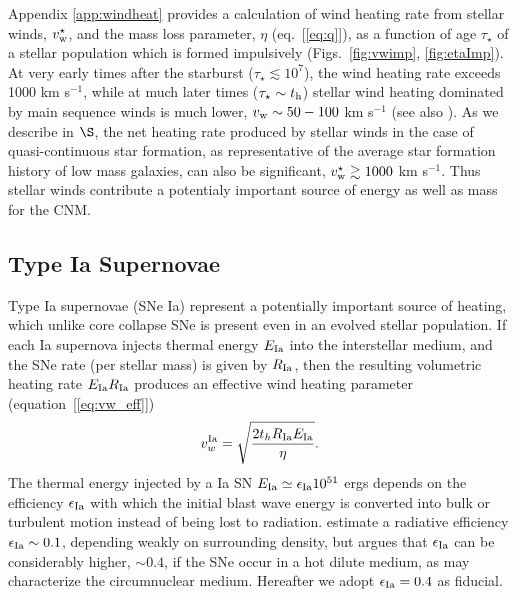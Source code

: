 \documentclass[usenatbib,fleqn]{mn2e}
\begin{document}
Appendix \ref{app:windheat} provides a calculation of wind heating rate from stellar winds, $v_{\rm w}^{\star}$, and the mass loss parameter, $\eta$ (eq.~[\ref{eq:q}]), as a function of age $\tau_{\star}$ of a stellar population which is formed impulsively (Figs.~\ref{fig:vwimp}, \ref{fig:etaImp}).  At very early times after the starburst ($\tau_{\star} \lesssim 10^{7}$), the wind heating rate exceeds 1000 km s$^{-1}$, while at much later times ($\tau_{\star} \sim t_{\rm h}$) stellar wind heating dominated by main sequence winds is much lower, $v_{\rm w} \sim 50-100 $ km s$^{-1}$ (see also \citealt{NaimanSoares-Furtado+:2013a}).  As we describe in $\S$, the net heating rate produced by stellar winds in the case of quasi-continuous star formation, as representative of the average star formation history of low mass galaxies, can also be significant, $v_{\rm w}^{\star} \gtrsim 1000$ km s$^{-1}$.  Thus stellar winds contribute a potentialy important source of energy as well as mass for the CNM.

\subsection{Type Ia Supernovae} 

Type Ia supernovae (SNe Ia) represent a potentially important source of heating, which unlike core collapse SNe is present even in an evolved stellar population.  If each Ia supernova injects thermal energy $E_{\rm Ia}$ into the interstellar medium, and the SNe rate (per stellar mass) is given by $R_{\rm   Ia}$, then the resulting volumetric heating rate $E_{\rm Ia}R_{\rm  Ia}$ produces an effective wind heating parameter (equation~[\ref{eq:vw_eff}]) \begin{align} v_{w}^{\rm Ia} =\sqrt{\frac{2 t_h R_{\rm Ia}
E_{\rm Ia}}{\eta}} \label{eq:vw_sne}.
\end{align} The thermal energy injected by a Ia SN $E_{\rm Ia} \simeq
\epsilon_{\rm Ia} 10^{51}$ ergs depends on the efficiency $\epsilon_{\rm Ia}$
with which the initial blast wave energy is converted into bulk or turbulent
motion instead of being lost to radiation.  \cite{Thornton+98}
estimate a radiative efficiency $\epsilon_{\rm Ia} \sim 0.1$,
depending weakly on surrounding density, but \citet{Sharma+14} argues
that $\epsilon_{\rm Ia}$ can be considerably higher, $\sim 0.4$, if
the SNe occur in a hot dilute medium, as may characterize the circumnuclear medium.  Hereafter we adopt $\epsilon_{\rm Ia} = 0.4$ as fiducial.
\end{document}
